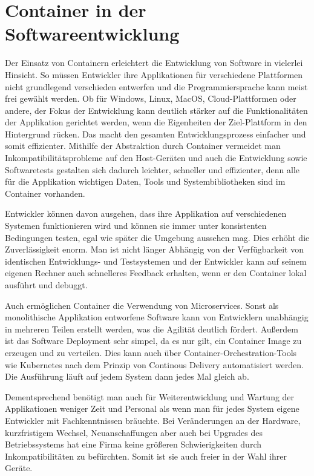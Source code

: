 \section{Container in der Softwareentwicklung} 
\label{sec:Softwareentwicklung}

Der Einsatz von Containern erleichtert die Entwicklung von Software in vielerlei Hinsicht. So müssen Entwickler ihre Applikationen für verschiedene Plattformen nicht grundlegend verschieden entwerfen und die Programmiersprache kann meist frei gewählt werden. 
Ob für Windows, Linux, MacOS, Cloud-Plattformen oder andere, der Fokus der Entwicklung kann deutlich stärker auf die Funktionalitäten der Applikation gerichtet werden, wenn die Eigenheiten der Ziel-Plattform in den Hintergrund rücken. Das macht den gesamten Entwicklungsprozess einfacher und somit effizienter.
Mithilfe der Abstraktion durch Container vermeidet man Inkompatibilitätsprobleme auf den Host-Geräten und auch die Entwicklung sowie Softwaretests gestalten sich dadurch leichter, schneller und effizienter, denn alle für die Applikation wichtigen Daten, Tools und Systembibliotheken sind im Container vorhanden.
\citep{11517836120160501}

Entwickler können davon ausgehen, dass ihre Applikation auf verschiedenen Systemen funktionieren wird und können sie immer unter konsistenten Bedingungen testen, egal wie später die Umgebung aussehen mag. Dies erhöht die Zuverlässigkeit enorm. Man ist nicht länger Abhängig von der Verfügbarkeit von identischen Entwicklungs- und Testsystemen und der Entwickler kann auf seinem eigenen Rechner auch schnelleres Feedback erhalten, wenn er den Container lokal ausführt und debuggt.

Auch ermöglichen Container die Verwendung von Microservices. Sonst als monolithische Applikation entworfene Software kann von Entwicklern unabhängig in mehreren Teilen erstellt werden, was die Agilität deutlich fördert.
Außerdem ist das Software Deployment sehr simpel, da es nur gilt, ein Container Image zu erzeugen und zu verteilen. Dies kann auch über Container-Orchestration-Tools wie Kubernetes nach dem Prinzip von Continous Delivery automatisiert werden. Die Ausführung läuft auf jedem System dann jedes Mal gleich ab.
\citep{ItAgil}

Dementsprechend benötigt man auch für Weiterentwicklung und Wartung der Applikationen weniger Zeit und Personal als wenn man für jedes System eigene Entwickler mit Fachkenntnissen bräuchte.
Bei Veränderungen an der Hardware, kurzfristigem Wechsel, Neuanschaffungen aber auch bei Upgrades des Betriebssystems hat eine Firma keine größeren Schwierigkeiten durch Inkompatibilitäten zu befürchten. Somit ist sie auch freier in der Wahl ihrer Geräte.


